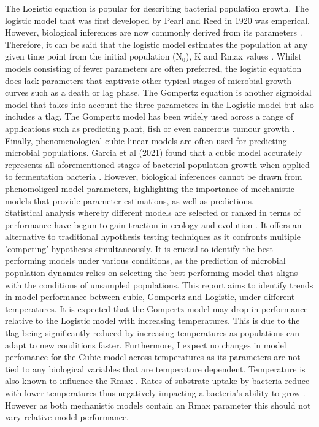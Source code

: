 \documentclass[12pt]{article}
\begin{document}
The Logistic equation is popular for describing bacterial population growth. The logistic model that was first developed by Pearl and Reed in 1920 was emperical. However, biological inferences are now commonly derived from its parameters \cite{WACHENHEIM2003157} \cite{Pearl1920}. Therefore, it can be said that the logistic model estimates the population at any given time point from the initial population ($\mathrm{N}_0$), K and Rmax values \cite{WACHENHEIM2003157}. Whilst models consisting of fewer parameters are often preferred, the logistic equation does lack parameters that captivate other typical stages of microbial growth curves such as a death or lag phase. The Gompertz equation is another sigmoidal model that takes into account the three parameters in the Logistic model but also includes a tlag. The Gompertz model has been widely used across a range of applications such as predicting plant, fish or even cancerous tumour growth \cite{Tjrve2017}. Finally, phenomenological cubic linear models are often used for predicting microbial populations. Garcia et al (2021) found that a cubic model accurately represents all aforementioned stages of bacterial population growth when applied to fermentation bacteria \cite{Garcia2021}. However, biological inferences cannot be drawn from phenomoligcal model parameters, highlighting the importance of mechanistic models that provide parameter estimations, as well as predictions.\\

Statistical analysis whereby different models are selected or ranked in terms of performance have begun to gain traction in ecology and evolution \cite{JOHNSON2004101}. It offers an alternative to traditional hypothesis testing techniques as it confronts multiple 'competing' hypotheses simultaneously. It is crucial to identify the best performing models under various conditions, as the prediction of microbial population dynamics relies on selecting the best-performing model that aligns with the conditions of unsampled populations. This report aims to identify trends in model performance between cubic, Gompertz and Logistic, under different temperatures. It is expected that the Gompertz model may drop in performance relative to the Logistic model with increasing temperatures. This is due to the tlag being significantly reduced by increasing temperatures \cite{ABA2021109108} as populations can adapt to new conditions faster. Furthermore, I expect no changes in model perfomance for the Cubic model across temperatures as its parameters are not tied to any biological variables that are temperature dependent. Temperature is also known to influence the Rmax \cite{Ward1972} \cite{Dey2020}. Rates of substrate uptake by bacteria reduce with lower temperatures thus negatively impacting a bacteria's ability to grow \cite{Nedwell1994}. However as both mechanistic models contain an Rmax parameter this should not vary relative model performance.\\
\end{document}
